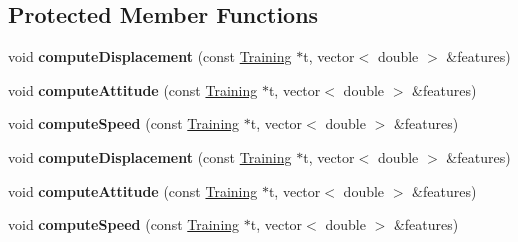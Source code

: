 \subsection*{Protected Member Functions}
\begin{DoxyCompactItemize}
\item 
\hypertarget{class_m_l_data_ae765a15668c6e9712f8a80e0e7e51318}{void {\bfseries compute\-Displacement} (const \hyperlink{class_training}{Training} $\ast$t, vector$<$ double $>$ \&features)}\label{class_m_l_data_ae765a15668c6e9712f8a80e0e7e51318}

\item 
\hypertarget{class_m_l_data_a1b7e769886def696342570e1cc8dfed3}{void {\bfseries compute\-Attitude} (const \hyperlink{class_training}{Training} $\ast$t, vector$<$ double $>$ \&features)}\label{class_m_l_data_a1b7e769886def696342570e1cc8dfed3}

\item 
\hypertarget{class_m_l_data_a41b970ab7a434b3b8f17abdae6008993}{void {\bfseries compute\-Speed} (const \hyperlink{class_training}{Training} $\ast$t, vector$<$ double $>$ \&features)}\label{class_m_l_data_a41b970ab7a434b3b8f17abdae6008993}

\item 
\hypertarget{class_m_l_data_ae765a15668c6e9712f8a80e0e7e51318}{void {\bfseries compute\-Displacement} (const \hyperlink{class_training}{Training} $\ast$t, vector$<$ double $>$ \&features)}\label{class_m_l_data_ae765a15668c6e9712f8a80e0e7e51318}

\item 
\hypertarget{class_m_l_data_a1b7e769886def696342570e1cc8dfed3}{void {\bfseries compute\-Attitude} (const \hyperlink{class_training}{Training} $\ast$t, vector$<$ double $>$ \&features)}\label{class_m_l_data_a1b7e769886def696342570e1cc8dfed3}

\item 
\hypertarget{class_m_l_data_a41b970ab7a434b3b8f17abdae6008993}{void {\bfseries compute\-Speed} (const \hyperlink{class_training}{Training} $\ast$t, vector$<$ double $>$ \&features)}\label{class_m_l_data_a41b970ab7a434b3b8f17abdae6008993}

\end{DoxyCompactItemize}
